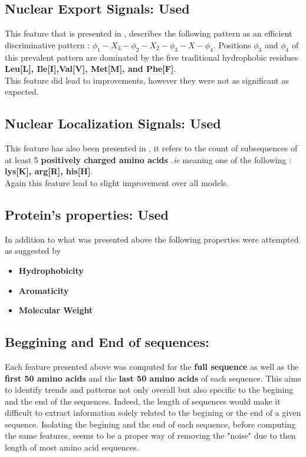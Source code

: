 \documentclass{bioinfo}
\begin{document}
\subsection{Nuclear Export Signals: \textbf{Used}}

This feature that is presented in \cite{Xua12}, describes the following pattern as an efficient discriminative pattern : $\phi_{1}-X_3-\phi_{2}-X_2-\phi_{3}-X-\phi_{4}$. Positions $\phi_3$ and $\phi_4$ of this prevalent pattern are dominated by the five traditional hydrophobic residues \textbf{Leu[L], Ile[I],Val[V], Met[M], and Phe[F]}. \\
This feature did lead to improvements, however they were not as significant as expected.

\subsection{Nuclear Localization Signals: \textbf{Used}}

This feature has also been presented in \cite{Xua12}, it refers to the count of subsequences of at least 5 \textbf{positively charged amino acids} \textit{.ie} meaning one of the following : \textbf{lys[K], arg[R], his[H]}.\\
Again this feature lead to slight improvement over all models.

\subsection{Protein's properties: \textbf{Used}}
In addition to what was presented above the following properties were attempted as suggested by \cite{gao05}
\begin{itemize}
	\item \textbf{Hydrophobicity}
	\item \textbf{Aromaticity}
	\item \textbf{Molecular Weight}
\end{itemize}

\subsection{Beggining and End of sequences: }
Each feature presented above was computed for the \textbf{full sequence} as well as the \textbf{first 50 amino acids} and the \textbf{last 50 amino acids} of each sequence. This aims to identify trends and patterns not only overall but also specific to the begining and the end of the sequences. Indeed, the length of sequences would make it difficult to extract information solely related to the begining or the end of a given sequence. Isolating the begining and the end of each sequence, before computing the same features, seems to be a proper way of removing the "noise" due to then length of most amino acid sequences.
\end{document}
